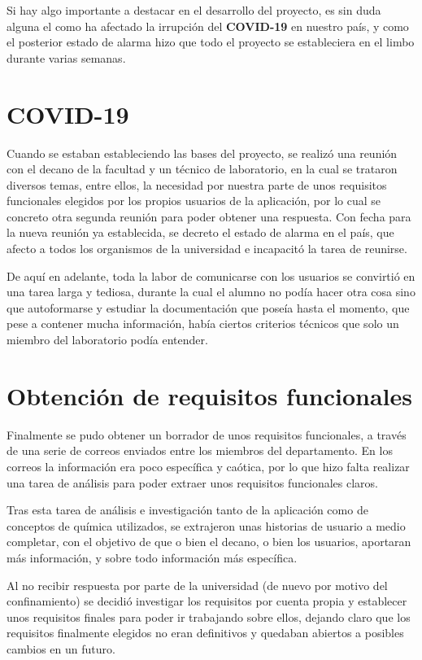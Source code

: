 
Si hay algo importante a destacar en el desarrollo del proyecto, es sin duda alguna el como ha afectado la irrupción del \textbf{COVID-19} en nuestro país, y como el posterior estado de alarma hizo que todo el proyecto se estableciera en el limbo durante varias semanas.

\section{COVID-19}

Cuando se estaban estableciendo las bases del proyecto, se realizó una reunión con el decano de la facultad y un técnico de laboratorio, en la cual se trataron diversos temas, entre ellos, la necesidad por nuestra parte de unos requisitos funcionales elegidos por los propios usuarios de la aplicación, por lo cual se concreto otra segunda reunión para poder obtener una respuesta. Con fecha para la nueva reunión ya establecida, se decreto el estado de alarma en el país, que afecto a todos los organismos de la universidad e incapacitó la tarea de reunirse. 

De aquí en adelante, toda la labor de comunicarse con los usuarios se convirtió en una tarea larga y tediosa, durante la cual el alumno no podía hacer otra cosa sino que autoformarse y estudiar la documentación que poseía hasta el momento, que pese a contener mucha información, había ciertos criterios técnicos que solo un miembro del laboratorio podía entender.

\section{Obtención de requisitos funcionales}

Finalmente se pudo obtener un borrador de unos requisitos funcionales, a través de una serie de correos enviados entre los miembros del departamento. En los correos la información era poco específica y caótica, por lo que hizo falta realizar una tarea de análisis para poder extraer unos requisitos funcionales claros. 

Tras esta tarea de análisis e investigación tanto de la aplicación como de conceptos de química utilizados, se extrajeron unas historias de usuario a medio completar, con el objetivo de que o bien el decano, o bien los usuarios, aportaran más información, y sobre todo información más específica. 

Al no recibir respuesta por parte de la universidad (de nuevo por motivo del confinamiento) se decidió investigar los requisitos por cuenta propia y establecer unos requisitos finales para poder ir trabajando sobre ellos, dejando claro que los requisitos finalmente elegidos no eran definitivos y quedaban abiertos a posibles cambios en un futuro.

